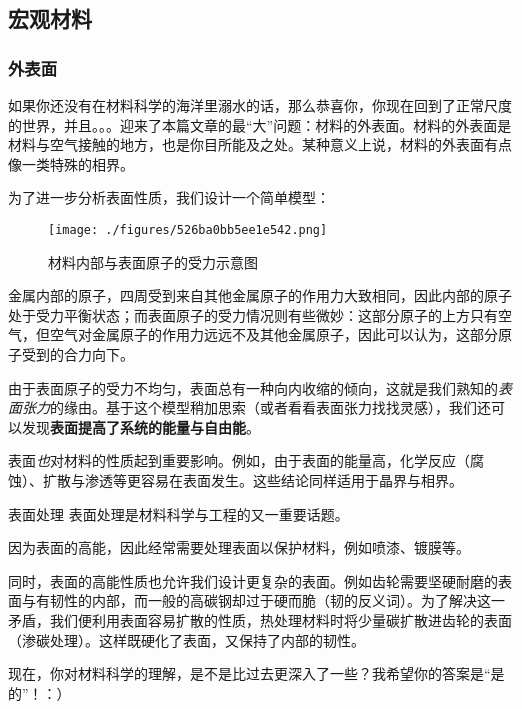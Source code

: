 \subsection{宏观材料}\label{sub_MetInt_1}

\subsubsection{外表面}
如果你还没有在材料科学的海洋里溺水的话，那么恭喜你，你现在回到了正常尺度的世界，并且。。。迎来了本篇文章的最“大”问题：材料的外表面。材料的外表面是材料与空气接触的地方，也是你目所能及之处。某种意义上说，材料的外表面有点像一类特殊的相界。

为了进一步分析表面性质，我们设计一个简单模型：
\begin{figure}[ht]
\centering
\texttt{[image: ./figures/526ba0bb5ee1e542.png]}
\caption{材料内部与表面原子的受力示意图} \label{fig_MetInt_17}
\end{figure}
金属内部的原子，四周受到来自其他金属原子的作用力大致相同，因此内部的原子处于受力平衡状态；而表面原子的受力情况则有些微妙：这部分原子的上方只有空气，但空气对金属原子的作用力远远不及其他金属原子，因此可以认为，这部分原子受到的合力向下。

由于表面原子的受力不均匀，表面总有一种向内收缩的倾向，这就是我们熟知的\textsl{表面张力}的缘由。基于这个模型稍加思索（或者看看表面张力找找灵感），我们还可以发现\textbf{表面提高了系统的能量与自由能}。

表面\textsl{也}对材料的性质起到重要影响。例如，由于表面的能量高，化学反应（腐蚀）、扩散与渗透等更容易在表面发生。这些结论同样适用于晶界与相界。

\begin{example}{表面处理}
表面处理是材料科学与工程的又一重要话题。

因为表面的高能，因此经常需要处理表面以保护材料，例如喷漆、镀膜等。

同时，表面的高能性质也允许我们设计更复杂的表面。例如齿轮需要坚硬耐磨的表面与有韧性的内部，而一般的高碳钢却过于硬而脆（韧的反义词）。为了解决这一矛盾，我们便利用表面容易扩散的性质，热处理材料时将少量碳扩散进齿轮的表面（渗碳处理）。这样既硬化了表面，又保持了内部的韧性。
\end{example}

现在，你对材料科学的理解，是不是比过去更深入了一些？我希望你的答案是“是的”！：）
